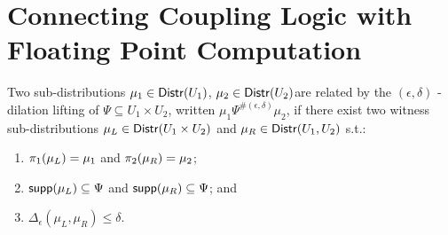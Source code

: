 \documentclass[a4paper,11pt]{article}
\begin{document}
\section{
Connecting Coupling Logic
%
with Floating Point Computation
}
%
\begin{defn}
Two sub-distributions $\mu_1 \in \mathsf{Distr}(U_1)$, $\mu_2 \in \mathsf{Distr}(U_2)$are related by the $(\epsilon, \delta)$ - dilation lifting of $\Psi \subseteq U_1 \times U_2$, written $\mu_1 \Psi^{\#(\epsilon, \delta)} \mu_2$, if there exist two witness sub-distributions $\mu_L \in \mathsf{Distr}(U_1 \times U_2)$ and $\mu_R \in \mathsf{Distr}(U_1, U_2)$ s.t.:
\begin{enumerate}
	\item $\pi_1(\mu_L) = \mu_1$ and $\pi_2(\mu_R) = \mu_2$;
	\item $\mathsf{supp}(\mu_L) \subseteq \Psi$ and $\mathsf{supp}(\mu_R) \subseteq \Psi$; and
	\item $\Delta_{\epsilon}(\mu_L, \mu_R) \leq \delta$.
\end{enumerate}
\end{defn}
%
\newpage
\end{document}
